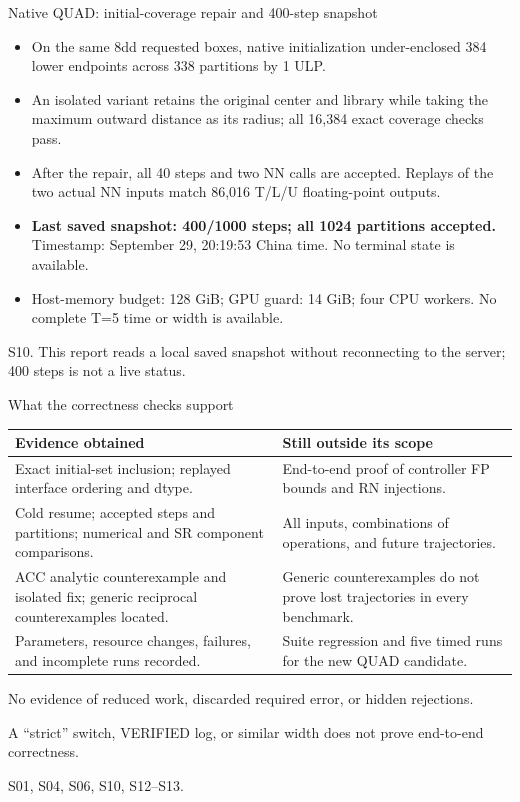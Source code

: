 \documentclass[aspectratio=169,11pt]{beamer}
\newcommand{\src}[1]{\par\vfill{\fontsize{7}{9}\selectfont\color{gray}#1\par}}
\begin{document}
\begin{frame}[t]{Native QUAD: initial-coverage repair and 400-step snapshot}
\relax
\relax
\begin{itemize}
\item On the same 8dd requested boxes, native initialization under-enclosed 384 lower endpoints across 338 partitions by 1 ULP.
\item An isolated variant retains the original center and library while taking the maximum outward distance as its radius; all 16,384 exact coverage checks pass.
\item After the repair, all 40 steps and two NN calls are accepted. Replays of the two actual NN inputs match 86,016 T/L/U floating-point outputs.
\item \textbf{Last saved snapshot: 400/1000 steps; all 1024 partitions accepted.} Timestamp: September 29, 20:19:53 China time. No terminal state is available.
\item Host-memory budget: 128 GiB; GPU guard: 14 GiB; four CPU workers. No complete T=5 time or width is available.
\end{itemize}
\src{S10. This report reads a local saved snapshot without reconnecting to the server; 400 steps is not a live status.}
\end{frame}

\begin{frame}[t]{What the correctness checks support}
\relax
\relax
{\footnotesize\renewcommand{\arraystretch}{1.12}\noindent\begin{tabularx}{\linewidth}{@{}X X@{}}\toprule
\textbf{Evidence obtained} & \textbf{Still outside its scope}\\\midrule
Exact initial-set inclusion; replayed interface ordering and dtype. & End-to-end proof of controller FP bounds and RN injections.\\
Cold resume; accepted steps and partitions; numerical and SR component comparisons. & All inputs, combinations of operations, and future trajectories.\\
ACC analytic counterexample and isolated fix; generic reciprocal counterexamples located. & Generic counterexamples do not prove lost trajectories in every benchmark.\\
Parameters, resource changes, failures, and incomplete runs recorded. & Suite regression and five timed runs for the new QUAD candidate.\\
\bottomrule\end{tabularx}\par{}}\vspace{0.3cm}No evidence of reduced work, discarded required error, or hidden rejections.\par{}A ``strict'' switch, VERIFIED log, or similar width does not prove end-to-end correctness.
\src{S01, S04, S06, S10, S12–S13.}
\end{frame}
\end{document}
